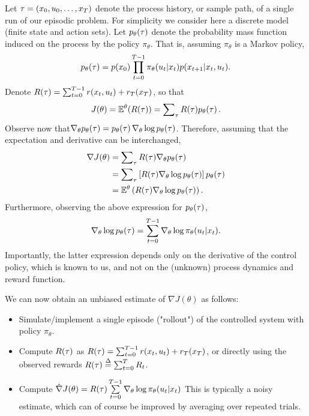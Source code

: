 Let ${\bf{\tau }} = ({x_0},{u_0}, \ldots ,{x_T})$ denote the process history, or sample path, of a single run of our episodic problem.  For simplicity we consider here a discrete model (finite state and action sets). Let ${p_\theta }({\bf{\tau }})$ denote the probability mass function induced on the process by the policy ${\pi _\theta }$. That is, assuming ${\pi _\theta }$ is a Markov policy,
\[{p_\theta }({\bf{\tau }}) = p({x_0})\prod\limits_{t = 0}^{T - 1} {{\pi _\theta }({u_t}|{x_t})p({x_{t + 1}}|{x_t},{u_t})}. \]
Denote $R({\bf{\tau }}) = \sum\nolimits_{t = 0}^{T - 1} {r({x_t},{u_t}) + {r_T}({x_T})} $, so that
\[J(\theta ) = {\mathbb E^\theta }(R({\bf{\tau }})) = \sum\nolimits_{\bf{\tau }} {R({\bf{\tau }}){p_\theta }({\bf{\tau }})\,} .\]
Observe now that${\nabla _\theta }{p_\theta }({\bf{\tau }}) = {p_\theta }({\bf{\tau }})\,{\nabla _\theta }\log {p_\theta }({\bf{\tau }})$. Therefore, assuming that the expectation and derivative can be interchanged,
\begin{align*}
\nabla J(\theta ) &= \sum\nolimits_{\bf{\tau }} {R({\bf{\tau }}){\nabla _\theta }{p_\theta }({\bf{\tau }})} \\
 &= \sum\nolimits_{\bf{\tau }} {[R({\bf{\tau }}){\nabla _\theta }\log {p_\theta }({\bf{\tau }})]\,{p_\theta }({\bf{\tau }})} \\
 &= {\mathbb E^\theta }\left( {R({\bf{\tau }}){\nabla _\theta }\log {p_\theta }({\bf{\tau }})} \right).
\end{align*}
Furthermore, observing the above expression for ${p_\theta }({\bf{\tau }})$,
\[{\nabla _\theta }\log {p_\theta }({\bf{\tau }}) = \sum\limits_{t = 0}^{T - 1} {{\nabla _\theta }\log {\pi _\theta }({u_t}|{x_t})} .\]
Importantly, the latter expression depends only on the derivative of the control policy, which is known to us, and not on the (unknown) process dynamics and reward function.

We can now obtain an unbiased estimate of $\nabla J(\theta )$ as follows:
\begin{itemize}
  \item Simulate/implement a single episode ("rollout") of the controlled system with policy ${\pi _\theta }$.
  \item Compute $R({\bf{\tau }})$ as $R({\bf{\tau }}) = \sum\nolimits_{t = 0}^{T - 1} {r({x_t},{u_t}) + {r_T}({x_T})} $, or directly using the observed rewards $R({\bf{\tau }}) \buildrel \Delta \over = \sum\nolimits_{t = 0}^T {{R_t}} $.
  \item Compute   $\hat \nabla J(\theta ) = R({\bf{\tau }})\sum\limits_{t = 0}^{T - 1} {{\nabla _\theta }\log {\pi _\theta }({u_t}|{x_t})} $
This is typically a noisy estimate, which can of course be improved by averaging over repeated trials.
\end{itemize}

